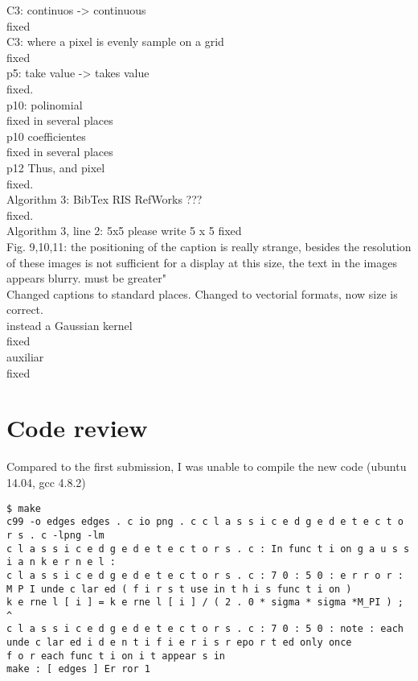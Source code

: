 \documentclass[a4paper,10pt]{report}
\begin{document}
\que C3: continuos -> continuous\\
\ans fixed\\
\que C3: where a pixel is evenly sample on a grid \\
\ans fixed\\
\que p5: take value -> takes value \\
\ans fixed.\\
\que  p10: polinomial \\
\ans fixed in several places\\
\que p10 coefficientes \\
\ans fixed in several places\\
\que p12 Thus, and pixel\\
\ans fixed.\\
\que Algorithm 3: BibTex RIS RefWorks ???\\
\ans fixed.\\
\que Algorithm 3, line 2: 5x5 please write 5 x 5
\ans fixed\\
\que Fig. 9,10,11: the positioning of the caption is really strange, besides the resolution of these images is not sufficient for a display at this size, the text in the images appears blurry. must be greater"\\
\ans Changed captions to standard places. Changed to vectorial formats, now size is correct.\\
\que instead a Gaussian kernel\\
\ans fixed\\
\que auxiliar\\
\ans fixed\\
\section{Code review}

\que Compared to the first submission, I was unable to compile the new code (ubuntu 14.04, gcc 4.8.2)
\begin{verbatim}
$ make
c99 -o edges edges . c io png . c c l a s s i c e d g e d e t e c t o r s . c -lpng -lm
c l a s s i c e d g e d e t e c t o r s . c : In func t i on g a u s s i a n k e r n e l :
c l a s s i c e d g e d e t e c t o r s . c : 7 0 : 5 0 : e r r o r : M P I unde c lar ed ( f i r s t use in t h i s func t i on )
k e rne l [ i ] = k e rne l [ i ] / ( 2 . 0 * sigma * sigma *M_PI ) ;
^
c l a s s i c e d g e d e t e c t o r s . c : 7 0 : 5 0 : note : each unde c lar ed i d e n t i f i e r i s r epo r t ed only once
f o r each func t i on i t appear s in
make : [ edges ] Er ror 1
\end{verbatim}
\end{document}
